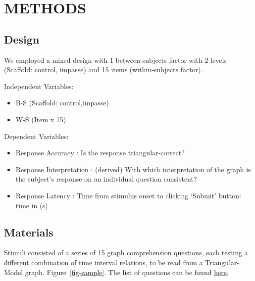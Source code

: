 \documentclass[
  letterpaper,
  DIV=11,
  numbers=noendperiod]{scrreprt}
\providecommand{\tightlist}{%
  \setlength{\itemsep}{0pt}\setlength{\parskip}{0pt}}\usepackage{longtable,booktabs,array}
\begin{document}
\hypertarget{methods}{%
\section{METHODS}\label{methods}}

\hypertarget{design}{%
\subsection{Design}\label{design}}

We employed a mixed design with 1 between-subjects factor with 2 levels
(Scaffold: control, impasse) and 15 items (within-subjects factor).

Independent Variables:

\begin{itemize}
\tightlist
\item
  B-S (Scaffold: control,impasse)
\item
  W-S (Item x 15)
\end{itemize}

Dependent Variables:

\begin{itemize}
\tightlist
\item
  Response Accuracy : Is the response triangular-correct?
\item
  Response Interpretation : (derived) With which interpretation of the
  graph is the subject's response on an individual question consistent?
\item
  Response Latency : Time from stimulus onset to clicking `Submit'
  button: time in (s)
\end{itemize}

\hypertarget{materials}{%
\subsection{Materials}\label{materials}}

Stimuli consisted of a series of 15 graph comprehension questions, each
testing a different combination of time interval relations, to be read
from a Triangular-Model graph. Figure~\ref{fig-sample}. The list of
questions can be found \href{static/stimuli/sgcx_questions.csv}{here}.
\end{document}
